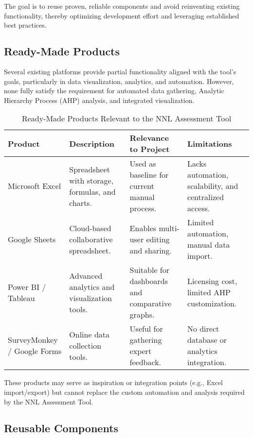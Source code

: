 \documentclass[12pt]{article}
\begin{document}
The goal is to reuse proven, reliable components and avoid reinventing existing functionality, thereby optimizing development effort and leveraging established best practices.

\subsection{Ready-Made Products}

Several existing platforms provide partial functionality aligned with the tool’s goals, particularly in data visualization, analytics, and automation. However, none fully satisfy the requirement for automated data gathering, Analytic Hierarchy Process (AHP) analysis, and integrated visualization.

\begin{table}[hp]
\caption{Ready-Made Products Relevant to the NNL Assessment Tool}
\begin{tabularx}{\textwidth}{p{2.8cm}X X X}
\toprule
\textbf{Product} & \textbf{Description} & \textbf{Relevance to Project} & \textbf{Limitations} \\
\midrule
Microsoft Excel & Spreadsheet with storage, formulas, and charts. & Used as baseline for current manual process. & Lacks automation, scalability, and centralized access. \\
\addlinespace[0.3em]
Google Sheets & Cloud-based collaborative spreadsheet. & Enables multi-user editing and sharing. & Limited automation, manual data import. \\
\addlinespace[0.3em]
Power BI / Tableau & Advanced analytics and visualization tools. & Suitable for dashboards and comparative graphs. & Licensing cost, limited AHP customization. \\
\addlinespace[0.3em]
SurveyMonkey / Google Forms & Online data collection tools. & Useful for gathering expert feedback. & No direct database or analytics integration. \\
\bottomrule
\end{tabularx}
\end{table}

These products may serve as inspiration or integration points (e.g., Excel import/export) but cannot replace the custom automation and analysis required by the NNL Assessment Tool.

\subsection{Reusable Components}
\end{document}
